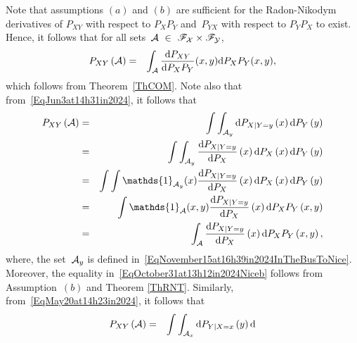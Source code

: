 \documentclass[lettersize,onecolumn]{IEEEtran}
\begin{document}
\begin{IEEEproof}
Note that assumptions $\left(a\right)$ 
and $\left(b\right)$ are sufficient for the Radon-Nikodym derivatives of $P_{XY}$ with respect to $P_XP_Y$
and~$P_{YX}$ with respect to $P_YP_X$ to exist. Hence, it follows that for all sets~$\mathcal A~\in~ \mathscr{F}_{\mathcal X} \times \mathscr{F}_{\mathcal Y}$,
\begin{eqnarray}
\label{EqJanuary19at21h57inDubai}
P_{XY }\left( \mathcal A \right) & = & \int_{\mathcal A} \frac{\mathrm{d}P_{XY}} {\mathrm{d}P_{X}P_{Y}} (x,y) \mathrm{d}P_{X}P_{Y} (x,y),   
\end{eqnarray}
which follows from Theorem~\ref{ThCOM}.
Note also that from~\eqref{EqJun3at14h31in2024}, it follows that
\begin{eqnarray}
\label{EqOctober31at13h12in2024Nicea}
P_{X Y }\left( \set{A} \right) & = & \int \int_{ \set{A}_{y} } \mathrm{d} P_{X | Y = y} \left( x \right) \mathrm{d} P_{Y} \left( y\right)\\
\label{EqOctober31at13h12in2024Niceb}
&=& \int \int_{ \set{A}_{y} } \frac{\mathrm{d} P_{X | Y = y} }{\mathrm{d}P_{X}} \left( x \right) \mathrm{d}P_{X}\left( x \right) 
\mathrm{d} P_{Y} \left( y\right)  \\
\label{EqNovember15at16h25in2024InTheBusToNiceA}
& = & \int \int \mathds{1}_{\set{A}_y}(x) \frac{\mathrm{d} P_{X | Y = y} }{\mathrm{d}P_{X}} \left( x \right)  \mathrm{d}P_{X}\left( x \right) 
\mathrm{d} P_{Y} \left( y\right)  \\
\label{EqNovember15at16h25in2024InTheBusToNiceB}
& = & \int \mathds{1}_{\set{A}}(x,y) \frac{\mathrm{d} P_{X | Y = y} }{\mathrm{d}P_{X}} \left( x \right)  \mathrm{d} P_{X} P_{Y} \left(x, 
y\right)  \\
\label{EqOctober31at13h12in2024Nicec}
& = & \int_{\set{A}} \frac{\mathrm{d} P_{X | Y = y} }{\mathrm{d}P_{X}} \left( x \right) \mathrm{d} P_{X} P_{Y} \left(x,  y\right), 
\end{eqnarray}
%
where, the set~$\mathcal A_{y}$ is defined in~\eqref{EqNovember15at16h39in2024InTheBusToNice}.  Moreover, the equality 
in~\eqref{EqOctober31at13h12in2024Niceb} follows from Assumption~$\left(b\right)$ and Theorem \ref{ThRNT}. 
%
Similarly, from~\eqref{EqMay20at14h23in2024}, it follows that 
%
\begin{eqnarray}
\label{EqNovember15at16h36in2024InTheBusToNiceA}
P_{X Y }\left( \set{A} \right)  & = & \int \int_{ \set{A}_{x} } \mathrm{d} P_{Y | X = x} \left( y \right) \mathrm{d} 

\end{eqnarray}
\end{IEEEproof}
\end{document}
